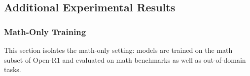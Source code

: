 \subsection{Additional Experimental Results}

\subsubsection{Math-Only Training}
This section isolates the math-only setting: models are trained on the math subset of Open-R1 and evaluated on math benchmarks as well as out-of-domain tasks.


